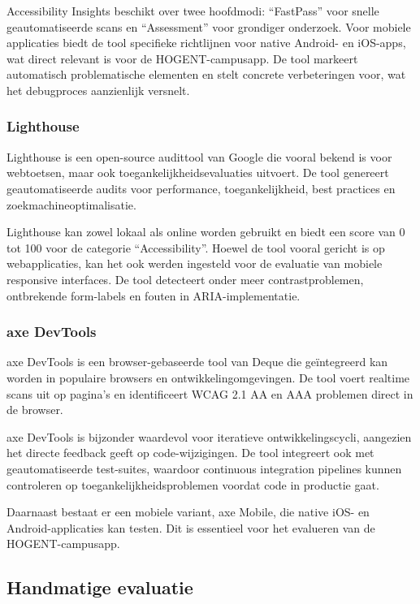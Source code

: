Accessibility Insights beschikt over twee hoofdmodi: ``FastPass'' voor snelle geautomatiseerde scans en ``Assessment'' voor grondiger onderzoek. Voor mobiele applicaties biedt de tool specifieke richtlijnen voor native Android- en iOS-apps, wat direct relevant is voor de HOGENT-campusapp. De tool markeert automatisch problematische elementen en stelt concrete verbeteringen voor, wat het debugproces aanzienlijk versnelt.

\subsubsection{Lighthouse}

Lighthouse is een open-source audittool van Google die vooral bekend is voor webtoetsen, maar ook toegankelijkheidsevaluaties uitvoert. De tool genereert geautomatiseerde audits voor performance, toegankelijkheid, best practices en zoekmachineoptimalisatie. \autocite{GoogleLighthouse2024}

Lighthouse kan zowel lokaal als online worden gebruikt en biedt een score van 0 tot 100 voor de categorie ``Accessibility''. Hoewel de tool vooral gericht is op webapplicaties, kan het ook werden ingesteld voor de evaluatie van mobiele responsive interfaces. De tool detecteert onder meer contrastproblemen, ontbrekende form-labels en fouten in ARIA-implementatie.

\subsubsection{axe DevTools}

axe DevTools is een browser-gebaseerde tool van Deque die geïntegreerd kan worden in populaire browsers en ontwikkelingomgevingen. De tool voert realtime scans uit op pagina's en identificeert WCAG 2.1 AA en AAA problemen direct in de browser. \autocite{DequueAxeDevTools2024}

axe DevTools is bijzonder waardevol voor iteratieve ontwikkelingscycli, aangezien het directe feedback geeft op code-wijzigingen. De tool integreert ook met geautomatiseerde test-suites, waardoor continuous integration pipelines kunnen controleren op toegankelijkheidsproblemen voordat code in productie gaat.

Daarnaast bestaat er een mobiele variant, axe Mobile, die native iOS- en Android-applicaties kan testen. Dit is essentieel voor het evalueren van de HOGENT-campusapp.

\subsection{Handmatige evaluatie}
\label{subsec:handmatige-evaluatie}

